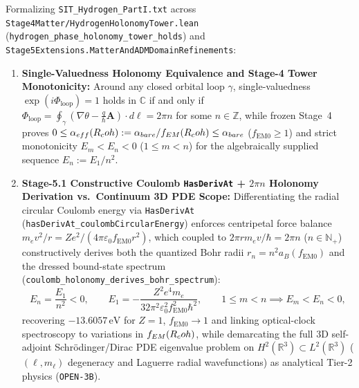 Formalizing \texttt{SIT\_\allowbreak{}Hydrogen\_\allowbreak{}Part\allowbreak{}I.\allowbreak{}txt} across \texttt{Stage4\allowbreak{}Matter/Hydrogen\allowbreak{}Holonomy\allowbreak{}Tower.\allowbreak{}lean} (\texttt{hydrogen\_\allowbreak{}phase\_\allowbreak{}holonomy\_\allowbreak{}tower\_\allowbreak{}holds}) and \texttt{Stage5\allowbreak{}Extensions.\allowbreak{}Matter\allowbreak{}And\allowbreak{}ADMDomain\allowbreak{}Refinements}:
\begin{enumerate}[leftmargin=2em]
  \item \textbf{Single-Valuedness Holonomy Equivalence and Stage-4 Tower Monotonicity:} Around any closed orbital loop $\gamma$, single-valuedness $\exp(i\Phi_{\mathrm{loop}}) = 1$ holds in $\mathbb{C}$ if and only if $\Phi_{\mathrm{loop}} = \oint_\gamma(\nabla\theta - \frac{q}{\hbar}\mathbf{A})\cdot d\boldsymbol{\ell} = 2\pi n$ for some $n \in \mathbb{Z}$, while frozen Stage~4 proves $0 \le \alpha_{eff}(R_coh) := \alpha_{bare}/f_{EM}(R_coh) \le \alpha_{bare}$ ($f_{\mathrm{EM}0} \ge 1$) and strict monotonicity $E_m < E_n < 0$ ($1 \le m < n$) for the algebraically supplied sequence $E_n := E_1/n^2$.
  \item \textbf{Stage-5.1 Constructive Coulomb \texttt{HasDerivAt} + $2\pi n$ Holonomy Derivation vs.\ Continuum 3D PDE Scope:} Differentiating the radial circular Coulomb energy via \texttt{HasDerivAt} (\texttt{has\allowbreak{}Deriv\allowbreak{}At\_\allowbreak{}coulomb\allowbreak{}Circular\allowbreak{}Energy}) enforces centripetal force balance $m_e v^2/r = Z e^2/(4\pi\varepsilon_0 f_{\mathrm{EM}0} r^2)$, which coupled to $2\pi r m_e v/\hbar = 2\pi n$ ($n \in \mathbb{N}_+$) constructively derives both the quantized Bohr radii $r_n = n^2 a_B(f_{\mathrm{EM}0})$ and the dressed bound-state spectrum (\texttt{coulomb\_\allowbreak{}holonomy\_\allowbreak{}derives\_\allowbreak{}bohr\_\allowbreak{}spectrum}):
  \begin{equation}
  E_n = \frac{E_1}{n^2} < 0,
  \qquad
  E_1 = -\frac{Z^2 e^4 m_e}{32\pi^2\varepsilon_0^2 f_{\mathrm{EM}0}^2 \hbar^2},
  \qquad
  1 \le m < n \implies E_m < E_n < 0,
  \label{eq:hydrogen_bohr_tower}
  \end{equation}
  recovering $-13.6057\,\mathrm{eV}$ for $Z=1$, $f_{\mathrm{EM}0} \to 1$ and linking optical-clock spectroscopy to variations in $f_{EM}(R_coh)$, while demarcating the full 3D self-adjoint Schr\"odinger/Dirac PDE eigenvalue problem on $H^2(\mathbb{R}^3) \subset L^2(\mathbb{R}^3)$ ($(\ell,m_\ell)$ degeneracy and Laguerre radial wavefunctions) as analytical Tier-2 physics (\texttt{OPEN-3B}).
\end{enumerate}

